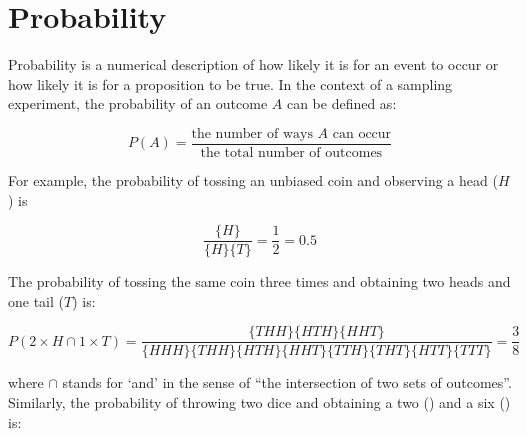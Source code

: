 \chapter{Probability}
\label{ch:probability}

Probability is a numerical description of how likely it is for an
event to occur or how likely it is for a proposition to be true.  In
the context of a sampling experiment, the probability of an outcome
$A$ can be defined as:

\begin{equation}
P(A) = \frac{\mbox{the number of ways }A\mbox{ can occur}}
{\mbox{the total number of outcomes}}
\end{equation}

For example, the probability of tossing an unbiased coin and observing
a head ($H$) is

\[
\frac{
  \{H\}
}{
  \{H\}\{T\}
} = \frac{1}{2} = 0.5
\]

The probability of tossing the same coin three times and obtaining two
heads and one tail ($T$) is:

\begin{equation}
  P\!\left(2\times{H} \cap 1\times{T}\right) =
  \frac{
    \{THH\}\{HTH\}\{HHT\}
  }{
    \{HHH\}\{THH\}\{HTH\}\{HHT\}\{TTH\}\{THT\}\{HTT\}\{TTT\}
  } = \frac{3}{8}
  \label{eq:2H1T}
\end{equation}

\noindent where $\cap$ stands for `and' in the sense of ``the
intersection of two sets of outcomes''. Similarly, the probability of
throwing two dice and obtaining a two () and
a six () is:
  
